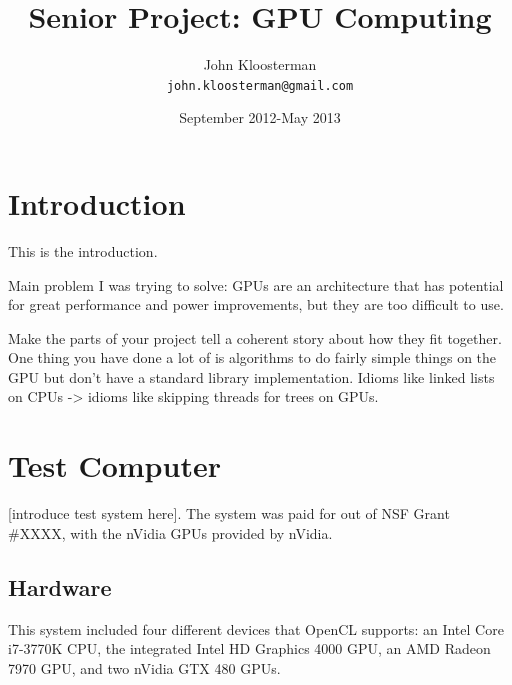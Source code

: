 \documentclass{article}
\begin{document}
\lstset{ 
  language=C++,
  belowcaptionskip=1\baselineskip,
  xleftmargin=\parindent,
  basicstyle=\footnotesize\ttfamily
 }

\title{Senior Project: GPU Computing}
\author{John Kloosterman \\
  \texttt{john.kloosterman@gmail.com}}
\date{September 2012-May 2013}
\maketitle


\section{Introduction}
This is the introduction.

Main problem I was trying to solve: GPUs are an architecture that has potential for great performance and power improvements, but they are too difficult to use.

Make the parts of your project tell a coherent story about how they fit together. One thing you have done a lot of is algorithms to do fairly simple things on the GPU but don't have a standard library implementation. Idioms like linked lists on CPUs -> idioms like skipping threads for trees on GPUs.

\tableofcontents

\section{Test Computer}
[introduce test system here]. The system was paid for out of NSF Grant \#XXXX, with the nVidia GPUs provided by nVidia.

\subsection{Hardware}
This system included four different devices that OpenCL supports: an Intel Core i7-3770K CPU, the integrated Intel HD Graphics 4000 GPU, an AMD Radeon 7970 GPU, and two nVidia GTX 480 GPUs.
\end{document}
